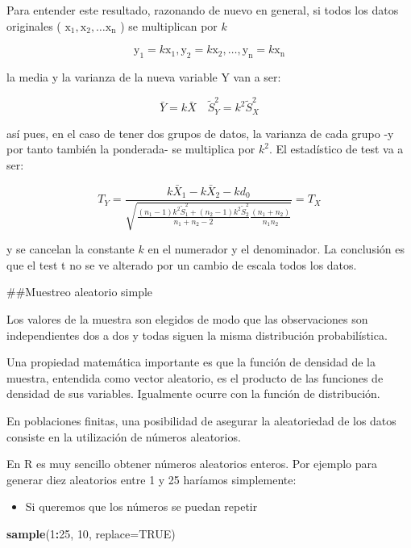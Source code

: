 \documentclass[
]{article}
\newenvironment{Shaded}{\begin{snugshade}}{\end{snugshade}}
\newcommand{\AttributeTok}[1]{\textcolor[rgb]{0.13,0.29,0.53}{#1}}
\newcommand{\ConstantTok}[1]{\textcolor[rgb]{0.56,0.35,0.01}{#1}}
\newcommand{\DecValTok}[1]{\textcolor[rgb]{0.00,0.00,0.81}{#1}}
\newcommand{\FunctionTok}[1]{\textcolor[rgb]{0.13,0.29,0.53}{\textbf{#1}}}
\newcommand{\NormalTok}[1]{#1}
\newcommand{\SpecialCharTok}[1]{\textcolor[rgb]{0.81,0.36,0.00}{\textbf{#1}}}
\providecommand{\tightlist}{%
  \setlength{\itemsep}{0pt}\setlength{\parskip}{0pt}}
\begin{document}
Para entender este resultado, razonando de nuevo en general, si todos los datos originales ( \(\mathrm{x}_{1}, \mathrm{x}_{2}, \ldots \mathrm{x}_{\mathrm{n}}\) ) se multiplican por \(k\)

\[
\mathrm{y}_{1}=k \mathrm{x}_{1}, \mathrm{y}_{2}=k \mathrm{x}_{2}, \ldots, \mathrm{y}_{\mathrm{n}}=k \mathrm{x}_{\mathrm{n}}
\]

la media y la varianza de la nueva variable Y van a ser:

\[
\bar{Y}=k \bar{X} \quad \widetilde{S}_{Y}^{2}=k^{2} \widetilde{S}_{X}^{2}
\]

así pues, en el caso de tener dos grupos de datos, la varianza de cada grupo -y por tanto también la ponderada- se multiplica por \(k^{2}\). El estadístico de test va a ser:

\[
T_{Y}=\frac{k \bar{X}_{1}-k \bar{X}_{2}-k d_{0}}{\sqrt{\frac{\left(n_{1}-1\right) k^{2} \widetilde{S}_{1}^{2}+\left(n_{2}-1\right) k^{2} \widetilde{S}_{2}^{2}}{n_{1}+n_{2}-2} \frac{\left(n_{1}+n_{2}\right)}{n_{1} n_{2}}}}=T_{X}
\]

y se cancelan la constante \(k\) en el numerador y el denominador. La conclusión es que el test t no se ve alterado por un cambio de escala todos los datos.

\#\#Muestreo aleatorio simple

Los valores de la muestra son elegidos de modo que las observaciones son independientes dos a dos y todas siguen la misma distribución probabilística.

Una propiedad matemática importante es que la función de densidad de la muestra, entendida como vector aleatorio, es el producto de las funciones de densidad de sus variables. Igualmente ocurre con la función de distribución.

En poblaciones finitas, una posibilidad de asegurar la aleatoriedad de los datos consiste en la utilización de números aleatorios.

En R es muy sencillo obtener números aleatorios enteros. Por ejemplo para generar diez aleatorios entre 1 y 25 haríamos simplemente:

\begin{itemize}
\tightlist
\item
  Si queremos que los números se puedan repetir
\end{itemize}

\begin{Shaded}
\begin{Highlighting}[]
\FunctionTok{sample}\NormalTok{(}\DecValTok{1}\SpecialCharTok{:}\DecValTok{25}\NormalTok{, }\DecValTok{10}\NormalTok{, }\AttributeTok{replace=}\ConstantTok{TRUE}\NormalTok{)}
\end{Highlighting}
\end{Shaded}
\end{document}
